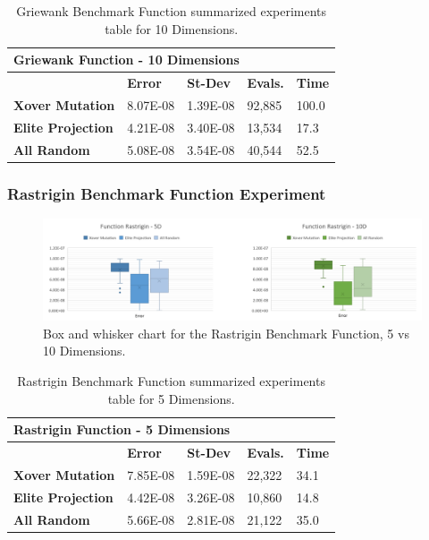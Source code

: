 \documentclass[graybox]{svmult}
\begin{document}
\begin{table}[]
    \scriptsize
    \centering
    \caption{Griewank Benchmark Function summarized experiments table for 10 Dimensions.}\label{tab.fun_griewank10}
    \begin{tabular}{@{}lllll@{}}
    \toprule
    \multicolumn{5}{l}{\textbf{Griewank Function - 10 Dimensions}} \\ \midrule
     & \textbf{Error} & \textbf{St-Dev} & \textbf{Evals.} & \textbf{Time} \\
    \textbf{Xover Mutation} & 8.07E-08 & 1.39E-08 & 92,885 & 100.0 \\
    \textbf{Elite Projection} & 4.21E-08 & 3.40E-08 & 13,534 & 17.3 \\
    \textbf{All Random} & 5.08E-08 & 3.54E-08 & 40,544 & 52.5 \\ \bottomrule
    \end{tabular}
    \end{table}


\subsubsection{Rastrigin Benchmark Function Experiment}

\begin{figure}
    \includegraphics[width=\textwidth]{img/fig_fun_rastrigin.pdf}
    \caption{Box and whisker chart for the Rastrigin Benchmark Function, 5 vs 10 Dimensions.} \label{fig.fun_rastrigin}
    \end{figure}

\begin{table}[]
    \scriptsize
    \centering
    \caption{Rastrigin Benchmark Function summarized experiments table for 5 Dimensions.}\label{tab.fun_rastrigin5}
    \begin{tabular}{@{}lllll@{}}
    \toprule
    \multicolumn{5}{l}{\textbf{Rastrigin Function - 5 Dimensions}} \\ \midrule
     & \textbf{Error} & \textbf{St-Dev} & \textbf{Evals.} & \textbf{Time} \\
    \textbf{Xover Mutation} & 7.85E-08 & 1.59E-08 & 22,322 & 34.1 \\
    \textbf{Elite Projection} & 4.42E-08 & 3.26E-08 & 10,860 & 14.8 \\
    \textbf{All Random} & 5.66E-08 & 2.81E-08 & 21,122 & 35.0 \\ \bottomrule
    \end{tabular}
    \end{table}
\end{document}
